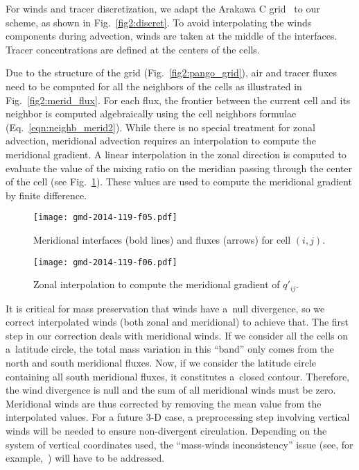    For winds and tracer discretization, we adapt the Arakawa
   C grid~\citep{Arakawa1977} to our scheme, as shown in
   Fig.~\ref{fig2:discret}. To avoid interpolating the
   winds components during advection, winds are taken at the middle of
   the interfaces. Tracer concentrations are defined at the centers of
   the cells.


   Due to the structure of the grid (Fig.~\ref{fig2:pango_grid}), air and tracer
   fluxes need to be computed for all the neighbors of the cells as illustrated
   in Fig.~\ref{fig2:merid_flux}. For each flux, the frontier between the current
   cell and its neighbor is computed algebraically using the cell neighbors
   formulae (Eq.~\ref{eqn:neighb_merid2}). While there is no special treatment
   for zonal advection, meridional advection requires an interpolation to
   compute the meridional gradient. A linear interpolation in the zonal
   direction is computed to evaluate the value of the mixing ratio on the meridian
   passing through the center of the cell (see Fig.~\ref{fig2:merid_gradient}).
   These values are used to compute the meridional gradient by
   finite difference.

\begin{figure}
  \begin{minipage}[t]{0.48\linewidth}
    \centering
    \texttt{[image: gmd-2014-119-f05.pdf]}
    \caption{Meridional interfaces (bold lines) and fluxes (arrows) for cell $(i,j)$.}
    \label{fig2:merid_flux}
  \end{minipage}
  \hfill
  \begin{minipage}[t]{0.48\linewidth}
    \centering
    \texttt{[image: gmd-2014-119-f06.pdf]}
    \caption{Zonal interpolation to compute the meridional gradient of $q'_{ij}$.}
    \label{fig2:merid_gradient}
  \end{minipage}
\end{figure}



   It is critical for mass preservation that winds have a~null divergence, so we
   correct interpolated winds (both zonal and meridional) to achieve that. The
   first step in our correction deals with meridional winds. If we consider all
   the cells on a~latitude circle, the total mass variation in this ``band''
   only comes from the north and south meridional fluxes. Now, if we consider
   the latitude circle containing all south meridional fluxes, it constitutes
   a~closed contour.  Therefore, the wind divergence is null and the sum of all
   meridional winds must be zero. Meridional winds are thus corrected by
   removing the mean value from the interpolated values. For a future 3-D case, a
   preprocessing step involving vertical winds will be needed to ensure
   non-divergent circulation. Depending on the system of vertical coordinates
   used, the ``mass-winds inconsistency'' issue (see, for
   example,~\cite{Jockel2001a}) will have to be addressed.

